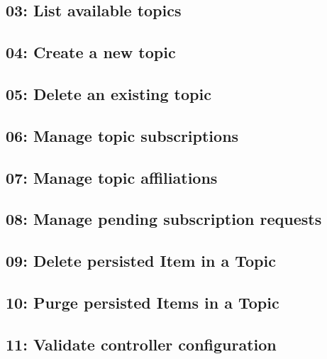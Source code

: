 \subsection{03: List available topics}

\subsection{04: Create a new topic}

\subsection{05: Delete an existing topic}

\subsection{06: Manage topic subscriptions}

\subsection{07: Manage topic affiliations}

\subsection{08: Manage pending subscription requests}

\subsection{09: Delete persisted Item in a Topic}

\subsection{10: Purge persisted Items in a Topic}

\subsection{11: Validate controller configuration}








